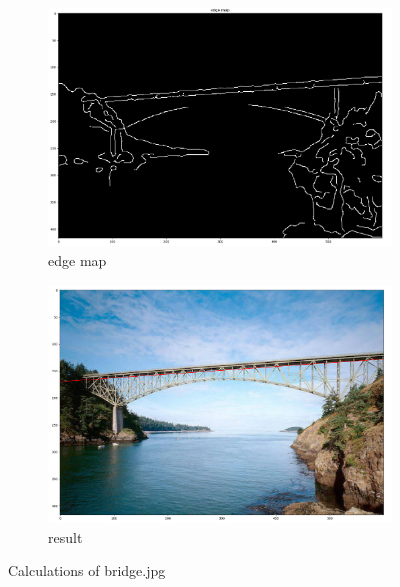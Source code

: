 \documentclass[12pt]{article}
\begin{document}
\begin{figure}[!htb]
  \centering
  \begin{subfigure}{.5\textwidth}
    \centering
    \includegraphics[width=0.95\linewidth]{pics/bridgeEdgeMap}
    \caption{edge map}
  \end{subfigure}%
  \begin{subfigure}{.5\textwidth}
    \centering
    \includegraphics[width=0.95\linewidth]{pics/bridge}
    \caption{result}
   \end{subfigure}
  \caption{Calculations of bridge.jpg}
\end{figure}
\end{document}
